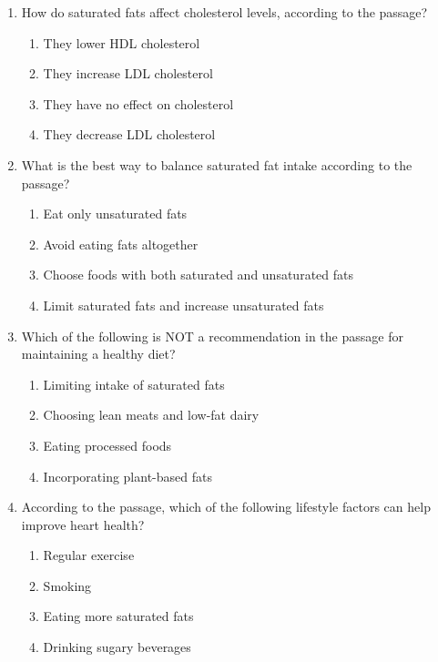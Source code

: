 \documentclass[12pt]{article}
\begin{document}
\begin{enumerate}
    \item How do saturated fats affect cholesterol levels, according to the passage?
    \begin{enumerate}[label=\Alph*.]
        \item They lower HDL cholesterol
        \item They increase LDL cholesterol
        \item They have no effect on cholesterol
        \item They decrease LDL cholesterol
    \end{enumerate}
    \vspace{0.5cm}

    \item What is the best way to balance saturated fat intake according to the passage?
    \begin{enumerate}[label=\Alph*.]
        \item Eat only unsaturated fats
        \item Avoid eating fats altogether
        \item Choose foods with both saturated and unsaturated fats
        \item Limit saturated fats and increase unsaturated fats
    \end{enumerate}
    \vspace{0.5cm}

    \item Which of the following is NOT a recommendation in the passage for maintaining a healthy diet?
    \begin{enumerate}[label=\Alph*.]
        \item Limiting intake of saturated fats
        \item Choosing lean meats and low-fat dairy
        \item Eating processed foods
        \item Incorporating plant-based fats
    \end{enumerate}
    \vspace{0.5cm}

    \item According to the passage, which of the following lifestyle factors can help improve heart health?
    \begin{enumerate}[label=\Alph*.]
        \item Regular exercise
        \item Smoking
        \item Eating more saturated fats
        \item Drinking sugary beverages
    \end{enumerate}
    \vspace{0.5cm}


\end{enumerate}
\end{document}
